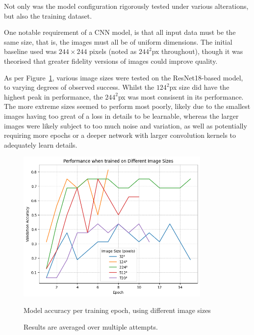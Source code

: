                         Not only was the model configuration rigorously tested under various alterations, but also the training dataset.
    
                        One notable requirement of a CNN model, is that all input data must be the same size, that is, the images must all be of uniform dimensions. The initial baseline used was \(244×244\) pixels (noted as \(244^2\)px throughout), though it was theorised that greater fidelity versions of images could improve quality.
    
                        As per Figure~\ref{fig:CNNSize_Perf}, various image sizes were tested on the ResNet18-based model, to varying degrees of observed success. Whilst the \(124^2\)px size did have the highest peak in performance, the \(244^2\)px was most consisent in its performance. The more extreme sizes seemed to perform most poorly, likely due to the smallest images having too great of a loss in details to be learnable, whereas the larger images were likely subject to too much noise and variation, as well as potentially requiring more epochs or a deeper network with larger convolution kernels to adequately learn details.
            
                        \begin{figure}[h]
                            \centering
                            \includegraphics[width=0.85\textwidth]{images/CNNSize_Perf.png}
                            \caption{Model accuracy per training epoch, using different image sizes}
                            \label{fig:CNNSize_Perf}
                            \caption*{Results are averaged over multiple attempts.}
                        \end{figure}
    
